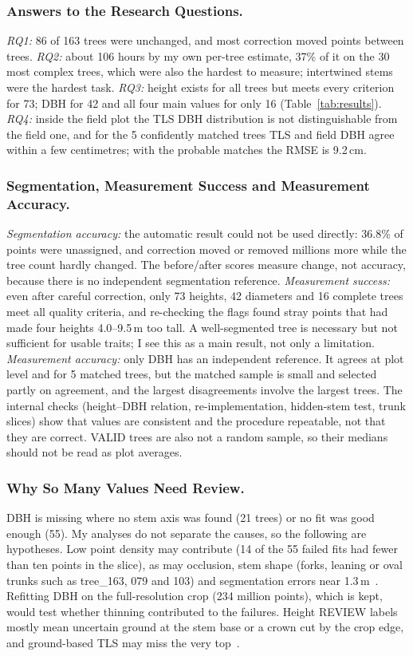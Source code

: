 \documentclass[runningheads]{llncs}
\begin{document}
\subsubsection{Answers to the Research Questions.}
\emph{RQ1:} 86 of 163 trees were unchanged, and most correction moved points between trees. \emph{RQ2:} about 106 hours by my own per-tree estimate, 37\% of it on the 30 most complex trees, which were also the hardest to measure; intertwined stems were the hardest task. \emph{RQ3:} height exists for all trees but meets every criterion for 73; DBH for 42 and all four main values for only 16 (Table~\ref{tab:results}). \emph{RQ4:} inside the field plot the TLS DBH distribution is not distinguishable from the field one, and for the 5 confidently matched trees TLS and field DBH agree within a few centimetres; with the probable matches the RMSE is 9.2\,cm.

\subsubsection{Segmentation, Measurement Success and Measurement Accuracy.}
\emph{Segmentation accuracy:} the automatic result could not be used directly: 36.8\% of points were unassigned, and correction moved or removed millions more while the tree count hardly changed. The before/after scores measure change, not accuracy, because there is no independent segmentation reference. \emph{Measurement success:} even after careful correction, only 73 heights, 42 diameters and 16 complete trees meet all quality criteria, and re-checking the flags found stray points that had made four heights 4.0--9.5\,m too tall. A well-segmented tree is necessary but not sufficient for usable traits; I see this as a main result, not only a limitation. \emph{Measurement accuracy:} only DBH has an independent reference. It agrees at plot level and for 5 matched trees, but the matched sample is small and selected partly on agreement, and the largest disagreements involve the largest trees. The internal checks (height--DBH relation, re-implementation, hidden-stem test, trunk slices) show that values are consistent and the procedure repeatable, not that they are correct. VALID trees are also not a random sample, so their medians should not be read as plot averages.

\subsubsection{Why So Many Values Need Review.}
DBH is missing where no stem axis was found (21 trees) or no fit was good enough (55). My analyses do not separate the causes, so the following are hypotheses. Low point density may contribute (14 of the 55 failed fits had fewer than ten points in the slice), as may occlusion, stem shape (forks, leaning or oval trunks such as tree\_163, 079 and 103) and segmentation errors near 1.3\,m~\cite{calders2020,cushman2026}. Refitting DBH on the full-resolution crop (234 million points), which is kept, would test whether thinning contributed to the failures. Height REVIEW labels mostly mean uncertain ground at the stem base or a crown cut by the crop edge, and ground-based TLS may miss the very top~\cite{calders2020,cushman2026}.
\end{document}
